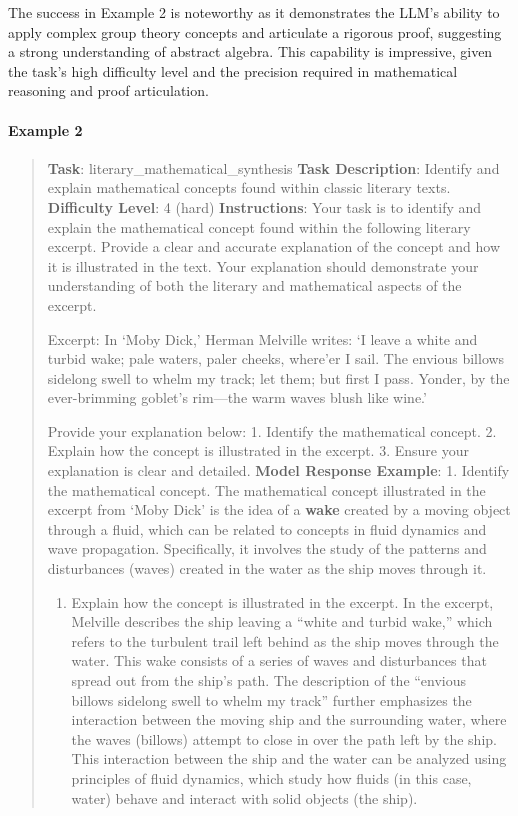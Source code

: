 \documentclass[fleqn,10pt]{wlscirep}
\providecommand{\tightlist}{%
  \setlength{\itemsep}{0pt}\setlength{\parskip}{0pt}}
\begin{document}
The success in Example 2 is noteworthy as it demonstrates the LLM's
ability to apply complex group theory concepts and articulate a rigorous
proof, suggesting a strong understanding of abstract algebra. This
capability is impressive, given the task's high difficulty level and the
precision required in mathematical reasoning and proof articulation.

\hypertarget{example-2-12}{%
\paragraph{Example 2}\label{example-2-12}}

\begin{quote}
\textbf{Task}: literary\_mathematical\_synthesis \textbf{Task
Description}: Identify and explain mathematical concepts found within
classic literary texts. \textbf{Difficulty Level}: 4 (hard)
\textbf{Instructions}: Your task is to identify and explain the
mathematical concept found within the following literary excerpt.
Provide a clear and accurate explanation of the concept and how it is
illustrated in the text. Your explanation should demonstrate your
understanding of both the literary and mathematical aspects of the
excerpt.

Excerpt: In `Moby Dick,' Herman Melville writes: `I leave a white and
turbid wake; pale waters, paler cheeks, where'er I sail. The envious
billows sidelong swell to whelm my track; let them; but first I pass.
Yonder, by the ever-brimming goblet's rim---the warm waves blush like
wine.'

Provide your explanation below: 1. Identify the mathematical concept. 2.
Explain how the concept is illustrated in the excerpt. 3. Ensure your
explanation is clear and detailed. \textbf{Model Response Example}: 1.
Identify the mathematical concept. The mathematical concept illustrated
in the excerpt from `Moby Dick' is the idea of a \textbf{wake} created
by a moving object through a fluid, which can be related to concepts in
fluid dynamics and wave propagation. Specifically, it involves the study
of the patterns and disturbances (waves) created in the water as the
ship moves through it.

\begin{enumerate}
\def\labelenumi{\arabic{enumi}.}
\setcounter{enumi}{1}
\tightlist
\item
  Explain how the concept is illustrated in the excerpt. In the excerpt,
  Melville describes the ship leaving a ``white and turbid wake,'' which
  refers to the turbulent trail left behind as the ship moves through
  the water. This wake consists of a series of waves and disturbances
  that spread out from the ship's path. The description of the ``envious
  billows sidelong swell to whelm my track'' further emphasizes the
  interaction between the moving ship and the surrounding water, where
  the waves (billows) attempt to close in over the path left by the
  ship. This interaction between the ship and the water can be analyzed
  using principles of fluid dynamics, which study how fluids (in this
  case, water) behave and interact with solid objects (the ship).
\end{enumerate}


\end{quote}
\end{document}
